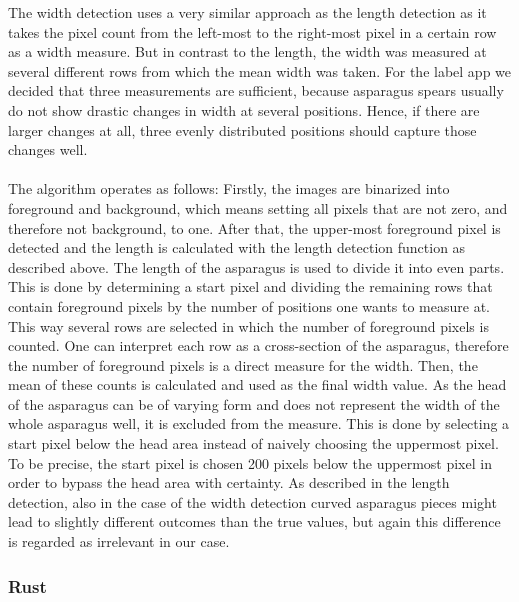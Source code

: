 The width detection uses a very similar approach as the length detection as it takes the pixel count from the left-most to the right-most  pixel in a certain row as a width measure. But in contrast to the length, the width was measured at several different rows from which the mean width was taken. For the label app we decided that three measurements are sufficient, because asparagus spears usually do not show drastic changes in width at several positions. Hence, if there are larger changes at all, three evenly distributed positions should capture those changes well. \\
\\
The algorithm operates as follows: Firstly, the images are binarized into foreground and background, which means setting all pixels that are not zero, and therefore not background, to one. After that, the upper-most foreground pixel is detected and the length is calculated with the length detection function as described above. The length of the asparagus is used to divide it into even parts. This is done by determining a start pixel and dividing the remaining rows that contain foreground pixels by the number of positions one wants to measure at. This way several rows are selected in which the number of foreground pixels is counted. One can interpret each row as a cross-section of the asparagus, therefore the number of foreground pixels is a direct measure for the width. Then, the mean of these counts is calculated and used as the final width value. As the head of the asparagus can be of varying form and does not represent the width of the whole asparagus well, it is excluded from the measure. This is done by selecting a start pixel below the head area instead of naively choosing the uppermost pixel. To be precise, the start pixel is chosen 200 pixels below the uppermost pixel in order to bypass the head area with certainty. As described in the length detection, also in the case of the width detection curved asparagus pieces might lead to slightly different outcomes than the true values, but again this difference is regarded as irrelevant in our case.

\subsubsection{Rust}
\label{subsec:Rust}


